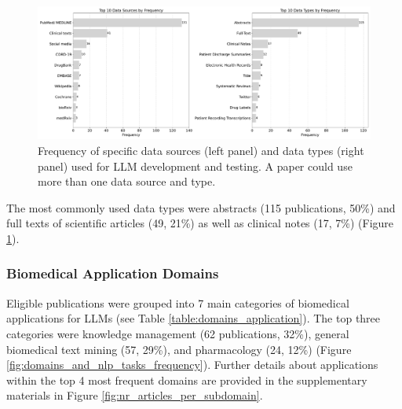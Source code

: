 \documentclass[fleqn,10pt]{olplainarticle}
\begin{document}
\begin{figure}[!ht]
\begin{center}
\includegraphics[scale=0.3]{visuals/new_pdf/top_10_data_types_and_sources_frequency_2024.pdf} %
\caption{Frequency of specific data sources (left panel) and data types (right panel) used for LLM development and testing. A paper could use more than one data source and type.}
\label{fig:top_10_data_sources_and_types}
\end{center}
\end{figure}

The most commonly used data types were abstracts (115 publications, 50\%) and full texts of scientific articles (49, 21\%) as well as clinical notes (17, 7\%) (Figure \ref{fig:top_10_data_sources_and_types}).

\subsubsection*{Biomedical Application Domains}
Eligible publications were grouped into 7 main categories of biomedical applications for LLMs (see Table \ref{table:domains_application}). The top three categories were knowledge management (62 publications, 32\%), general biomedical text mining (57, 29\%), and pharmacology (24, 12\%) (Figure \ref{fig:domains_and_nlp_tasks_frequency}). Further details about applications within the top 4 most frequent domains are provided in the supplementary materials in Figure \ref{fig:nr_articles_per_subdomain}.
\end{document}
